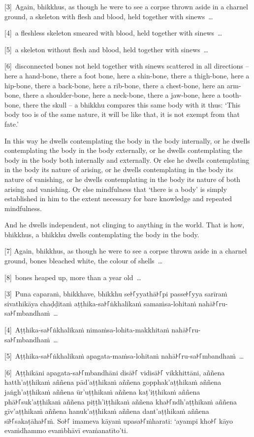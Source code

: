 \englishPage

[3]~Again, bhikkhus, as though he were to see a corpse thrown aside in a
charnel ground, a skeleton with flesh and blood, held together with sinews~\ldots{}

[4]~a fleshless skeleton smeared with blood, held together with sinews~\ldots{}

[5]~a skeleton without flesh and blood, held together with sinews~\ldots{}

[6]~disconnected bones not held together with sinews scattered in all directions
-- here a hand-bone, there a foot bone, here a shin-bone, there a thigh-bone,
here a hip-bone, there a back-bone, here a rib-bone, there a chest-bone, here an
arm-bone, there a shoulder-bone, here a neck-bone, there a jaw-bone, here a
tooth-bone, there the skull -- a bhikkhu compares this same body with it thus:
`This body too is of the same nature, it will be like that, it is not exempt
from that fate.'

In this way he dwells contemplating the body in the body internally, or he
dwells contemplating the body in the body externally, or he dwells contemplating
the body in the body both internally and externally. Or else he dwells
contemplating in the body its nature of arising, or he dwells contemplating in
the body its nature of vanishing, or he dwells contemplating in the body its
nature of both arising and vanishing. Or else mindfulness that ‘there is a body’
is simply established in him to the extent necessary for bare knowledge and
repeated mindfulness.

And he dwells independent, not clinging to anything in the world. That is how,
bhikkhus, a bhikkhu dwells contemplating the body in the body.

[7] Again, bhikkhus, as though he were to see a corpse thrown aside in a charnel
ground, bones bleached white, the colour of shells~\ldots{}

[8]~bones heaped up, more than a year old~\ldots{}

\paliPage

[3]~Puna caparaṁ, bhikkhave, bhikkhu se꜔꜒yyathā꜔꜒pi passe꜔꜒yya sarīraṁ sivathikāya
chaḍḍitaṁ aṭṭhika-sa꜔꜒ṅkhalikaṁ samaṁsa-lohitaṁ nahā꜔꜒ru-sa꜔꜒mbandhaṁ~\ldots{}

[4]~Aṭṭhika-sa꜔꜒ṅkhalikaṁ nimaṁsa-lohita-makkhitaṁ nahā꜔꜒ru-sa꜔꜒mbandhaṁ~\ldots{}

[5]~Aṭṭhika-sa꜔꜒ṅkhalikaṁ apagata-maṁsa-lohitaṁ nahā꜔꜒ru-sa꜔꜒mbandhaṁ~\ldots{}

[6]~Aṭṭhikāni apagata-sa꜔꜒mbandhāni disā꜔꜒ vidisā꜔꜒ vikkhittāni, aññena hatth'aṭṭhikaṁ
aññena pād'aṭṭhikaṁ aññena gopphak'aṭṭhikaṁ aññena jaṅgh'aṭṭhikaṁ aññena ūr'uṭṭhikaṁ
aññena kaṭ'iṭṭhikaṁ aññena phā꜔꜒suk'aṭṭhikaṁ aññena piṭṭh'iṭṭhikaṁ aññena
kha꜔꜒ndh'aṭṭhikaṁ aññena gīv'aṭṭhikaṁ aññena hanuk'aṭṭhikaṁ aññena dant'aṭṭhikaṁ
aññena sī꜔꜒sakaṭāha꜔꜒ṁ. So꜔꜒ imameva kāyaṁ upasa꜔꜒ṁharati: ‘ayampi kho꜔꜒ kāyo evaṁdhammo
evaṁbhāvī evaṁanatīto’ti.

